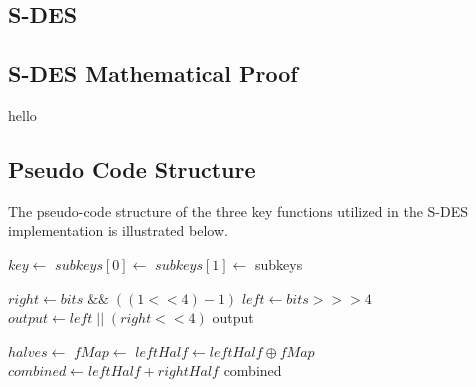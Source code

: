 \documentclass[]{article}
\begin{document}
\break

\vspace*{-0.8cm}
\begin{center}
	\section*{S-DES}
\end{center}

\vspace*{0.8cm}
\subsection*{S-DES Mathematical Proof}

hello

\subsection*{Pseudo Code Structure}

The pseudo-code structure of the three key functions utilized in the S-DES implementation is illustrated below.\\

\begin{algorithmic}
	\State $key\gets $ 
	\State {}
	\State $subkeys[0]\gets $ 
	\State {}
	\State $subkeys[1]\gets $ 
	\State \Return subkeys
\EndFunction
\end{algorithmic}


\vspace{0.5cm}

\begin{algorithmic}
		\State $ right \gets bits \;\&\&\; ( ( 1 << 4 ) - 1 ) $
		\State $ left \gets bits >>> 4 $
		\State $ output \gets left \;||\; ( right << 4 )$
		\State \Return output
	\EndFunction
\end{algorithmic}

\vspace{0.5cm}

\begin{algorithmic}
	
	\State $halves\gets $ 
	\State $fMap \gets $ 	
	\State $ leftHalf \gets leftHalf \oplus fMap $
	\State $ combined \gets leftHalf + rightHalf $
	\State \Return combined
	\EndFunction
\end{algorithmic}
\end{document}
